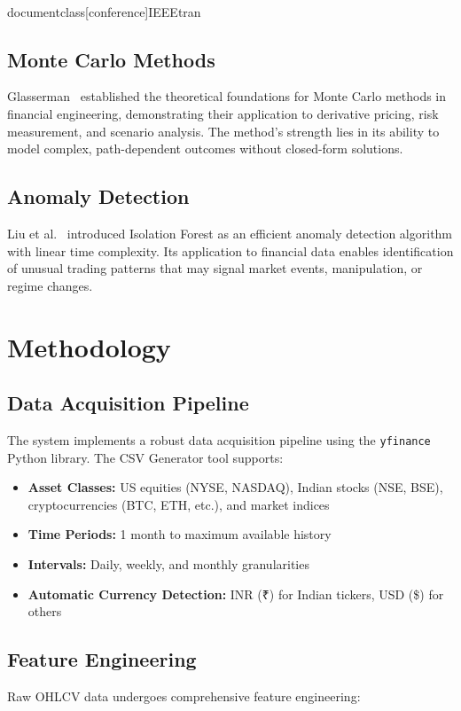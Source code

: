 \\documentclass[conference]{IEEEtran}
\begin{document}
\subsection{Monte Carlo Methods}
Glasserman~\cite{glasserman2003} established the theoretical foundations for Monte Carlo methods in financial engineering, demonstrating their application to derivative pricing, risk measurement, and scenario analysis. The method's strength lies in its ability to model complex, path-dependent outcomes without closed-form solutions.

\subsection{Anomaly Detection}
Liu et al.~\cite{liu2008} introduced Isolation Forest as an efficient anomaly detection algorithm with linear time complexity. Its application to financial data enables identification of unusual trading patterns that may signal market events, manipulation, or regime changes.

\section{Methodology}

\subsection{Data Acquisition Pipeline}
The system implements a robust data acquisition pipeline using the \texttt{yfinance} Python library. The CSV Generator tool supports:
\begin{itemize}
    \item \textbf{Asset Classes:} US equities (NYSE, NASDAQ), Indian stocks (NSE, BSE), cryptocurrencies (BTC, ETH, etc.), and market indices
    \item \textbf{Time Periods:} 1 month to maximum available history
    \item \textbf{Intervals:} Daily, weekly, and monthly granularities
    \item \textbf{Automatic Currency Detection:} INR (₹) for Indian tickers, USD (\$) for others
\end{itemize}

\subsection{Feature Engineering}
Raw OHLCV data undergoes comprehensive feature engineering:
\end{document}
